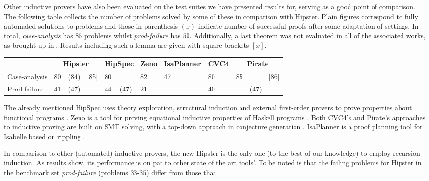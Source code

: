 Other inductive provers have also been evaluated on the test suites we have presented results for, serving as a good point of comparison.
%
The following table collects the number of problems solved by some of these in comparison with Hipster.
%
Plain figures correspond to fully automated solutions to problems and those in parenthesis $(x)$ indicate number of successful proofs after some adaptation of settings.
%
In total, \emph{case-analysis} has $85$ problems whilst \emph{prod-failure} has $50$.
%
Additionally, a last theorem was not evaluated in all of the associated works, as brought up in \cite{SPASSInduction}. Results including such a lemma are given with square brackets $[x]$.

\vspace{2 mm}

\noindent \begin{tabularx}{\textwidth}{l | X X X | X X | X | X | X | X X X}
  & \multicolumn{3}{|c|}{Hipster}
  	& \multicolumn{2}{c|}{HipSpec}
  	& \multicolumn{1}{c|}{Zeno}
  	& \multicolumn{1}{c|}{IsaPlanner}
  	& \multicolumn{1}{c|}{CVC4}
  	& \multicolumn{3}{c}{Pirate} \\
  \hline
  Case-analysis & 80 & (84) & [85] & 80 & & 82 & 47 & 80 & 85 & & [86] \\
  Prod-failure & 41 & (47) & & 44 & (47) & 21 & - & 40 & & (47) & \\
\end{tabularx}

\vspace{2 mm}

\noindent The already mentioned HipSpec uses theory exploration, structural induction and external first-order provers to prove properties about functional programs \cite{hipspecCADE}.
%
Zeno is a tool for proving equational inductive properties of Haskell programs \cite{zeno}.
%
Both CVC4's and Pirate's approaches to inductive proving are built on SMT solving, with a top-down approach in conjecture generation \cite{cvc4, SPASSInduction}.
%
IsaPlanner is a proof planning tool for Isabelle based on rippling \cite{isaplanner2, IsaPcase}.

In comparison to other (automated) inductive provers, the new Hipster is the only one (to the best of our knowledge) to employ recursion induction.
%
As results show, its performance is on par to other state of the art tools'.
%
To be noted is that the failing problems for Hipster in the benchmark set \emph{prod-failure} (problems $33$-$35$) differ from those that 



